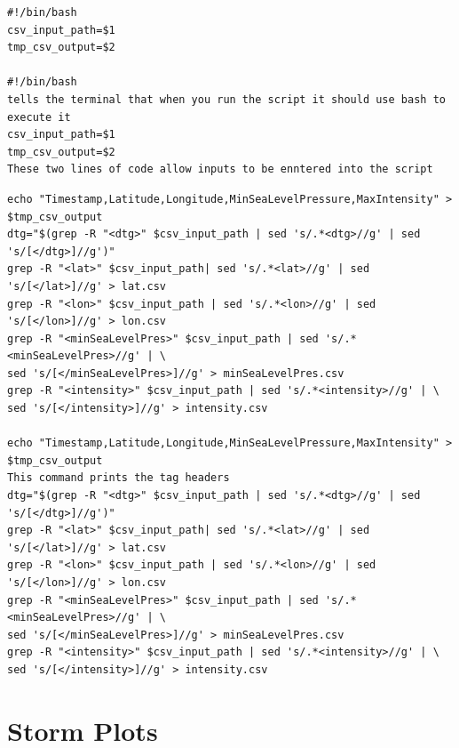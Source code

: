 \documentclass[]{article}
\begin{document}
\begin{tcolorbox}[colback=white, colframe=black, boxrule=0.5pt, arc=2mm, 
    title=\#!/bin/bash, fonttitle=\bfseries, listing only, listing options={language=sh, basicstyle=\ttfamily}]
    \begin{verbatim}
#!/bin/bash
csv_input_path=$1
tmp_csv_output=$2

#!/bin/bash 
tells the terminal that when you run the script it should use bash to execute it
csv_input_path=$1
tmp_csv_output=$2
These two lines of code allow inputs to be enntered into the script
    \end{verbatim}
\end{tcolorbox}
\begin{tcolorbox}[colback=white, colframe=black, boxrule=0.5pt, arc=2mm, 
    title=\#!/bin/bash, fonttitle=\bfseries, listing only, listing options={language=sh, basicstyle=\ttfamily}]
    \begin{verbatim}
echo "Timestamp,Latitude,Longitude,MinSeaLevelPressure,MaxIntensity" > $tmp_csv_output
dtg="$(grep -R "<dtg>" $csv_input_path | sed 's/.*<dtg>//g' | sed 's/[</dtg>]//g')"
grep -R "<lat>" $csv_input_path| sed 's/.*<lat>//g' | sed 's/[</lat>]//g' > lat.csv
grep -R "<lon>" $csv_input_path | sed 's/.*<lon>//g' | sed 's/[</lon>]//g' > lon.csv
grep -R "<minSeaLevelPres>" $csv_input_path | sed 's/.*<minSeaLevelPres>//g' | \
sed 's/[</minSeaLevelPres>]//g' > minSeaLevelPres.csv
grep -R "<intensity>" $csv_input_path | sed 's/.*<intensity>//g' | \ 
sed 's/[</intensity>]//g' > intensity.csv

echo "Timestamp,Latitude,Longitude,MinSeaLevelPressure,MaxIntensity" > $tmp_csv_output
This command prints the tag headers
dtg="$(grep -R "<dtg>" $csv_input_path | sed 's/.*<dtg>//g' | sed 's/[</dtg>]//g')"
grep -R "<lat>" $csv_input_path| sed 's/.*<lat>//g' | sed 's/[</lat>]//g' > lat.csv
grep -R "<lon>" $csv_input_path | sed 's/.*<lon>//g' | sed 's/[</lon>]//g' > lon.csv
grep -R "<minSeaLevelPres>" $csv_input_path | sed 's/.*<minSeaLevelPres>//g' | \
sed 's/[</minSeaLevelPres>]//g' > minSeaLevelPres.csv
grep -R "<intensity>" $csv_input_path | sed 's/.*<intensity>//g' | \ 
sed 's/[</intensity>]//g' > intensity.csv
    \end{verbatim}
\end{tcolorbox}
\clearpage



\section{Storm Plots}
\end{document}
